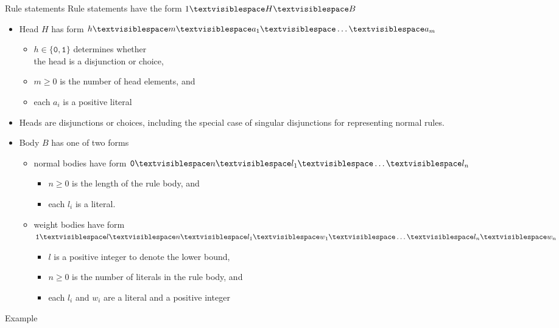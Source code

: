 \begin{frame}{Rule statements}
  \newcommand\Space{\textvisiblespace}
  Rule statements have the form
  \hfill \(1 \Space H \Space B\)\qquad\qquad
  \begin{itemize}
  \item<2-> Head $H$ has form
    \hfill\(h \Space m \Space a_1 \Space \dots \Space a_m\)\qquad\qquad
    \begin{itemize}
    \item $h \in \{\texttt{0},\texttt{1}\}$ determines whether\\ the head is a disjunction or choice,
    \item $m \geq 0$ is the number of head elements, and
    \item each $a_i$ is a positive literal
    \end{itemize}
  \item<2->[] Heads are disjunctions or choices, including the special case of singular disjunctions for representing normal rules.
  \item<3-> Body $B$ has one of two forms
    \begin{itemize}
    \item normal bodies have form
      \hfill\(\texttt{0} \Space n \Space l_{1} \Space \dots \Space l_n\)\qquad\qquad
      \begin{itemize}
      \item $n \geq 0$ is the length of the rule body, and
      \item each $l_i$ is a literal.
      \end{itemize}
    \item weight bodies have form
      \hfill\(\texttt{1} \Space l \Space n \Space l_1 \Space w_1  \Space \dots \Space l_n \Space w_n\)\qquad\qquad
      \begin{itemize}
      \item $l$ is a positive integer to denote the lower bound,
      \item $n \geq 0$ is the number of literals in the rule body, and
      \item each $l_i$ and $w_i$ are a literal and a positive integer
      \end{itemize}
    \end{itemize}
  \end{itemize}
\end{frame}
\begin{frame}[fragile,c]{Example}
\begin{center}
{\begin{minipage}[t]{0.3\textwidth}
%
\end{minipage}}%
\qquad\pause\qquad%
{\begin{minipage}[t]{0.3\textwidth}
%
\end{minipage}}%
\end{center}
\end{frame}
%
